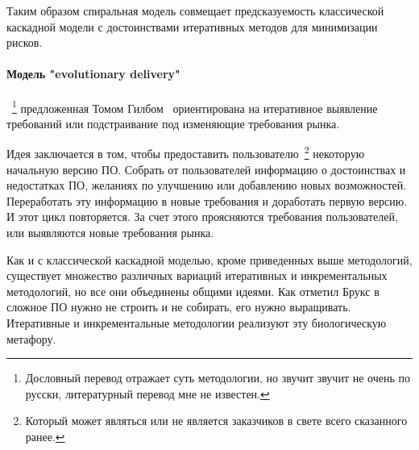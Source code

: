 Таким образом спиральная модель совмещает предсказуемость классической каскадной модели с достоинствами итеративных методов для минимизации рисков.

\paragraph{Модель "evolutionary delivery"}~\footnote{Дословный перевод отражает суть методологии, но звучит звучит не очень по русски, литературный перевод мне не известен.} предложенная Томом Гилбом~\cite{Gilb:1985:EDV} ориентирована на итеративное выявление требований или подстраивание под изменяющие требования рынка.

Идея заключается в том, чтобы предоставить пользователю~\footnote{Который может являться или не является заказчиков в свете всего сказанного ранее.} некоторую начальную версию ПО. Собрать от пользователей информацию о достоинствах и недостатках ПО, желаниях по улучшению или добавлению новых возможностей. Переработать эту информацию в новые требования и доработать первую версию. И этот цикл повторяется. За счет этого проясняются требования пользователей, или выявляются новые требования рынка.

Как и с классической каскадной моделью, кроме приведенных выше методологий, существует множество различных вариаций итеративных и инкрементальных методологий, но все они объединены общими идеями. Как отметил Брукс в~\cite{Brooks:1987:NSB} сложное ПО нужно не строить и не собирать, его нужно выращивать. Итеративные и инкрементальные методологии реализуют эту биологическую метафору.
